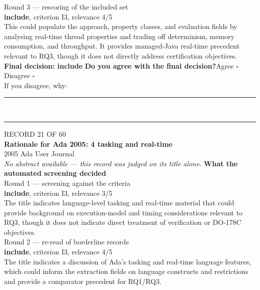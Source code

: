\documentclass[11pt,a4paper]{article}
\begin{document}
{\footnotesize\color{soft}Round 3 --- rescoring of the included set}\\[0.5mm]
{\small\textbf{include}, criterion I3, relevance 4/5}\\[0.5mm]
{\small This could populate the approach, property classes, and evaluation fields by analysing real-time thread properties and trading off determinism, memory consumption, and throughput. It provides managed-Java real-time precedent relevant to RQ3, though it does not directly address certification objectives.}\\[2.5mm]
{\small\textbf{Final decision: include}}
\vspace{2mm}
{\small\textbf{Do you agree with the final decision?}\quad{}Agree $\square$\qquad{}Disagree $\square$}\\[1mm]
{\footnotesize\color{soft}If you disagree, why:}\\[1mm]
\color{rule}\rule{\linewidth}{0.3pt}\\[3mm]\rule{\linewidth}{0.3pt}\color{black}
\clearpage
{\color{soft}\footnotesize RECORD 21 OF 60}\\[1mm]
{\large\bfseries Rationale for Ada 2005: 4 tasking and real-time}\\[1.5mm]
{\color{soft}\small 2005 \textperiodcentered{} Ada User Journal}\\[2mm]
{\small\itshape\color{soft}No abstract available --- this record was judged on its title alone.}
\vspace{3mm}
\vspace{2.5mm}
{\small\textbf{What the automated screening decided}}\\[2mm]
{\footnotesize\color{soft}Round 1 --- screening against the criteria}\\[0.5mm]
{\small\textbf{include}, criterion I3, relevance 3/5}\\[0.5mm]
{\small The title indicates language-level tasking and real-time material that could provide background on execution-model and timing considerations relevant to RQ3, though it does not indicate direct treatment of verification or DO-178C objectives.}\\[2.5mm]
{\footnotesize\color{soft}Round 2 --- re-read of borderline records}\\[0.5mm]
{\small\textbf{include}, criterion I3, relevance 4/5}\\[0.5mm]
{\small The title indicates a discussion of Ada's tasking and real-time language features, which could inform the extraction fields on language constructs and restrictions and provide a comparator precedent for RQ1/RQ3.}\\[2.5mm]
\end{document}
